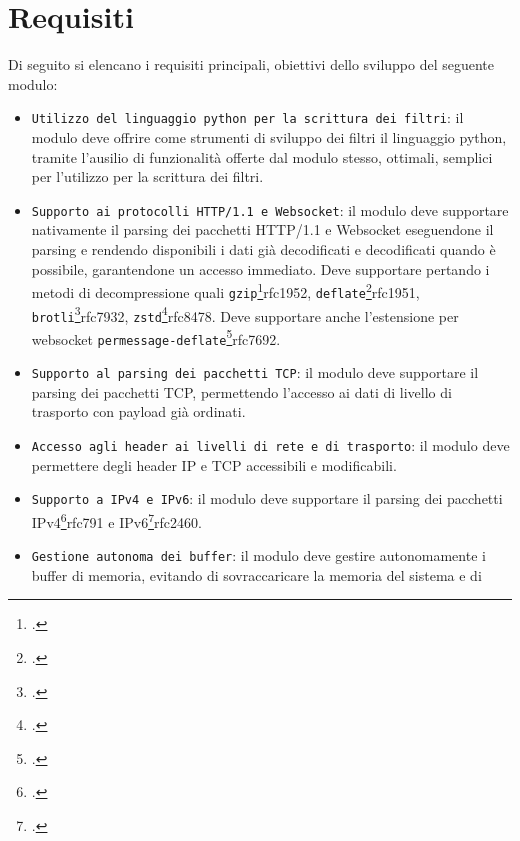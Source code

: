 \section{Requisiti}

Di seguito si elencano i requisiti principali, obiettivi dello sviluppo del seguente modulo:

\begin{itemize}
    \setlength{\itemsep}{5pt}
    \setlength{\parskip}{5pt}
    \item \texttt{Utilizzo del linguaggio python per la scrittura dei filtri}: il modulo deve offrire come strumenti di sviluppo dei filtri
    il linguaggio python, tramite l'ausilio di funzionalità offerte dal modulo stesso, ottimali, semplici per l'utilizzo per la scrittura dei filtri.
    \item \texttt{Supporto ai protocolli HTTP/1.1 e Websocket}: il modulo deve supportare nativamente il parsing dei pacchetti HTTP/1.1 e Websocket eseguendone il parsing
    e rendendo disponibili i dati già decodificati e decodificati quando è possibile, garantendone un accesso immediato. Deve supportare pertando i metodi di decompressione
    quali \texttt{gzip}\footcite{RFC1952, GZIP file format specification version 4.3}{rfc1952},
    \texttt{deflate}\footcite{RFC1951, DEFLATE Compressed Data Format Specification version 1.3}{rfc1951},
    \texttt{brotli}\footcite{RFC7932, Brotli Compressed Data Format}{rfc7932},
    \texttt{zstd}\footcite{RFC8478, Zstandard Compression and the application/zstd Media Type}{rfc8478}.
    Deve supportare anche l'estensione per websocket \texttt{permessage-deflate}\footcite{RFC7692, Compression Extensions for WebSocket}{rfc7692}.
    \item \texttt{Supporto al parsing dei pacchetti TCP}: il modulo deve supportare il parsing dei pacchetti TCP, permettendo l'accesso ai dati di livello di trasporto con payload già ordinati.
    \item \texttt{Accesso agli header ai livelli di rete e di trasporto}: il modulo deve permettere degli header IP e TCP accessibili e modificabili.
    \item \texttt{Supporto a IPv4 e IPv6}: il modulo deve supportare il parsing dei pacchetti IPv4\footcite{RFC791, Internet Protocol}{rfc791} e IPv6\footcite{RFC2460, Internet Protocol, Version 6 (IPv6) Specification}{rfc2460}.
    \item \texttt{Gestione autonoma dei buffer}: il modulo deve gestire autonomamente i buffer di memoria, evitando di sovraccaricare la memoria del sistema e di

\end{itemize}
